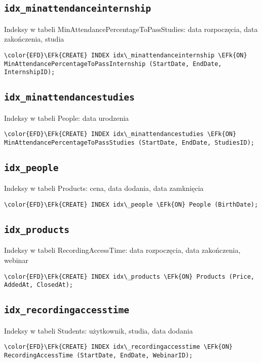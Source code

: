 \documentclass[11pt]{article}
\newcommand{\EFk}[1]{\textcolor{EFk}{\textbf{#1}}} %
\begin{document}
\subsection{\texttt{idx\_minattendanceinternship}}
\label{sec:orgbcd9a1d}
Indeksy w tabeli MinAttendancePercentageToPassStudies: data rozpoczęcia, data zakończenia, studia
\begin{Code}
\begin{Verbatim}
\color{EFD}\EFk{CREATE} INDEX idx\_minattendanceinternship \EFk{ON} MinAttendancePercentageToPassInternship (StartDate, EndDate, InternshipID);
\end{Verbatim}
\end{Code}
\subsection{\texttt{idx\_minattendancestudies}}
\label{sec:orgd5fb14c}
Indeksy w tabeli People: data urodzenia
\begin{Code}
\begin{Verbatim}
\color{EFD}\EFk{CREATE} INDEX idx\_minattendancestudies \EFk{ON} MinAttendancePercentageToPassStudies (StartDate, EndDate, StudiesID);
\end{Verbatim}
\end{Code}
\subsection{\texttt{idx\_people}}
\label{sec:orgaa23bb4}
Indeksy w tabeli Products: cena, data dodania, data zamknięcia
\begin{Code}
\begin{Verbatim}
\color{EFD}\EFk{CREATE} INDEX idx\_people \EFk{ON} People (BirthDate);
\end{Verbatim}
\end{Code}
\subsection{\texttt{idx\_products}}
\label{sec:org6c7bd2f}
Indeksy w tabeli RecordingAccessTime: data rozpoczęcia, data zakończenia, webinar
\begin{Code}
\begin{Verbatim}
\color{EFD}\EFk{CREATE} INDEX idx\_products \EFk{ON} Products (Price, AddedAt, ClosedAt);
\end{Verbatim}
\end{Code}
\subsection{\texttt{idx\_recordingaccesstime}}
\label{sec:org63bea4b}
Indeksy w tabeli Students: użytkownik, studia, data dodania
\begin{Code}
\begin{Verbatim}
\color{EFD}\EFk{CREATE} INDEX idx\_recordingaccesstime \EFk{ON} RecordingAccessTime (StartDate, EndDate, WebinarID);
\end{Verbatim}
\end{Code}
\end{document}
